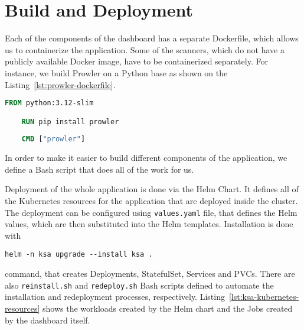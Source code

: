 \section{Build and Deployment}
\label{sec:build-and-deployment}

Each of the components of the dashboard has a separate Dockerfile, which allows us to containerize the application. Some of the scanners, which do not have a publicly available Docker image, have to be containerized separately. For instance, we build Prowler on a Python base as shown on the Listing~\ref{lst:prowler-dockerfile}.

\begin{lstlisting}[language=Dockerfile, caption={[Dockerfile definition of Prowler image] Dockerfile definition of Prowler image.}, label={lst:prowler-dockerfile}]
    FROM python:3.12-slim

    RUN pip install prowler
    
    CMD ["prowler"]    
\end{lstlisting}

In order to make it easier to build different components of the application, we define a Bash script that does all of the work for us. 

Deployment of the whole application is done via the Helm Chart. It defines all of the Kubernetes resources for the application that are deployed inside the cluster. The deployment can be configured using \lstinline{values.yaml} file, that defines the Helm values, which are then substituted into the Helm templates. Installation is done with 
\begin{center}
    \lstinline{helm -n ksa upgrade --install ksa .}
\end{center} 
command, that creates Deployments, StatefulSet, Services and PVCs. There are also \lstinline{reinstall.sh} and \lstinline{redeploy.sh} Bash scripts defined to automate the installation and redeployment processes, respectively. Listing~\ref{lst:ksa-kubernetes-resources} shows the workloads created by the Helm chart and the Jobs created by the dashboard itself.

